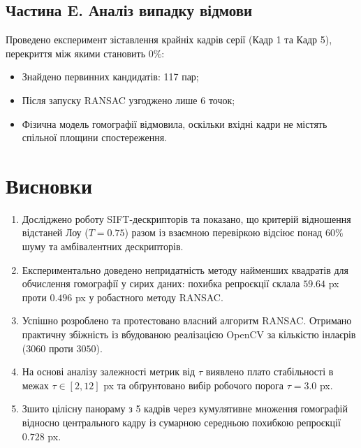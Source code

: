 \documentclass[12pt, a4paper]{article}
\begin{document}
	\begin{figure}[ht]
		\centering
	\end{figure}
	
	\subsection{Частина E. Аналіз випадку відмови}
	Проведено експеримент зіставлення крайніх кадрів серії (Кадр 1 та Кадр 5), перекриття між якими становить $0\%$:
	\begin{itemize}
		\item Знайдено первинних кандидатів: 117 пар;
		\item Після запуску RANSAC узгоджено лише 6 точок;
		\item Фізична модель гомографії відмовила, оскільки вхідні кадри не містять спільної площини спостереження.
	\end{itemize}
	
	\section{Висновки}
	\begin{enumerate}
		\item Досліджено роботу SIFT-дескрипторів та показано, що критерій відношення відстаней Лоу ($T = 0.75$) разом із взаємною перевіркою відсіює понад $60\%$ шуму та амбівалентних дескрипторів.
		\item Експериментально доведено непридатність методу найменших квадратів для обчислення гомографії у сирих даних: похибка репроєкції склала $59.64$ px проти $0.496$ px у робастного методу RANSAC.
		\item Успішно розроблено та протестовано власний алгоритм RANSAC. Отримано практичну збіжність із вбудованою реалізацією OpenCV за кількістю інлаєрів ($3060$ проти $3050$).
		\item На основі аналізу залежності метрик від $\tau$ виявлено плато стабільності в межах $\tau \in [2, 12]$ px та обґрунтовано вибір робочого порога $\tau = 3.0$ px.
		\item Зшито цілісну панораму з 5 кадрів через кумулятивне множення гомографій відносно центрального кадру із сумарною середньою похибкою репроєкції $0.728$ px.
	\end{enumerate}
	
\end{document}
